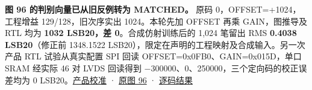 \documentclass[UTF8,fontset=none,zihao=-4,a4paper]{ctexart}
\begin{document}
\textbf{图 96 的判别向量已从旧反例转为 MATCHED。} 原码 0，OFFSET=\relax{}+\relax{}1024，工程增益 129/128，旧次序实出 1024。本轮先加 OFFSET 再乘 GAIN，图推导及 RTL 均为 \textbf{1032 LSB20，差 0}。合成仿射训练后的 1,024 笔留出 RMS \textbf{0.4038 LSB20}（修正前 1348.\relax{}1522 LSB20），限定在声明的工程映射及合成输入。另一次产品 RTL 试验从真实配置 SPI 回读 OFFSET=\relax{}0x0FB0、\allowbreak{}GAIN=\relax{}0x015D，单口 SRAM 经实际 46 对 LVDS 回读得到 −300000、\allowbreak{}0、\allowbreak{}250000，三个定向码的校正误差均为 0 LSB20。\href{https://github.com/defineiocc02/20bit\_SAR\_ADC\_Behaviour\_Verification/blob/feat/ad4080-peripherals/rtl/ad4080\_periph/integration/product/evidence/calibration.txt}{产品校准} · \href{https://www.analog.com/media/en/technical-documentation/data-sheets/ad4080.pdf\#page=64}{原图 96} · \href{https://github.com/defineiocc02/20bit\_SAR\_ADC\_Behaviour\_Verification/blob/feat/ad4080-peripherals/rtl/ad4080\_periph/calibration/rtl\_verification.json}{逐码结果}\par
\end{document}
